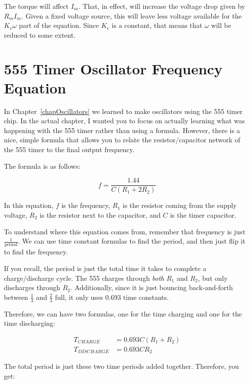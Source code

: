 The torque will affect $I_m$.
That, in effect, will increase the voltage drop given by $R_m I_m$.
Given a fixed voltage source, this will leave less voltage available for the $K_e \omega$ part of the equation.
Since $K_e$ is a constant, that means that $\omega$ will be reduced to some extent.


\section{555 Timer Oscillator Frequency Equation}
\label{apOscillatorFreq}

In Chapter~\ref{chapOscillators} we learned to make oscillators using the 555 timer chip.
In the actual chapter, I wanted you to focus on actually learning what was happening with the 555 timer rather than using a formula.
However, there is a nice, simple formula that allows you to relate the resistor/capacitor network of the 555 timer to the final output frequency.

The formula is as follows:

\begin{equation}
f = \frac{1.44}{C(R_1 + 2 R_2)}
\end{equation}

In this equation, $f$ is the frequency, $R_1$ is the resistor coming from the supply voltage, $R_2$ is the resistor next to the capacitor, and $C$ is the timer capacitor.

To understand where this equation comes from, remember that frequency is just $\frac{1}{\textrm{period}}$.
We can use time constant formulas to find the period, and then just flip it to find the frequency.

If you recall, the period is just the total time it takes to complete a charge/discharge cycle.  
The 555 charges through \emph{both} $R_1$ and $R_2$, but only discharges through $R_2$.
Additionally, since it is just bouncing back-and-forth between $\frac{1}{3}$ and $\frac{2}{3}$ full, it only uses $0.693$ time constants.

Therefore, we can have two formulas, one for the time charging and one for the time discharging:

\begin{align*}
T_{CHARGE} &= 0.693 C (R_1 + R_2) \\
T_{DISCHARGE} &= 0.693 C R_2
\end{align*}

The total period is just these two time periods added together.
Therefore, you get:

